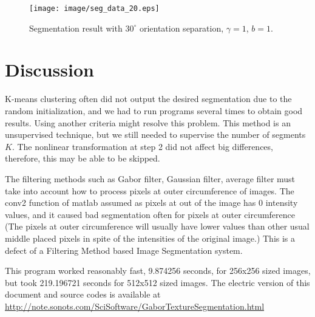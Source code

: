 \documentclass[article,oneside]{memoir}
\begin{document}
\begin{figure}[ht]
\begin{center}
\texttt{[image: image/seg\_data\_20.eps]}
\end{center}
 \caption{Segmentation result with $30^\circ$ orientation separation, $\gamma = 1$, $ b= 1$.}
 \label{fig:seg}
\end{figure}


\newpage

\chapter{Discussion}

K-means clustering often did not output the desired segmentation due to the random initialization, and we had to run programs several times to obtain good results. Using another criteria might resolve this problem. 
This method is an unsupervised technique, but we still needed to supervise the number of segments $ K $. 
The nonlinear transformation at step 2 did not affect big differences, therefore, this may be able to be skipped. 

The filtering methods such as Gabor filter, Gaussian filter, average filter must take into account how to process pixels at outer circumference of images. The conv2 function of matlab assumed as pixels at out of the image has 0 intensity values, and it caused bad segmentation often for pixels at outer circumference (The pixels at outer circumference will  usually have lower values than other usual middle placed pixels in spite of the intensities of the original image.) This is a defect of a Filtering Method based Image Segmentation system. 

This program worked reasonably fast, 9.874256 seconds, for 256x256 sized images, but took 219.196721 seconds for 512x512 sized images. 
The electric version of this document and source codes is available at \url{http://note.sonots.com/SciSoftware/GaborTextureSegmentation.html}
\end{document}
